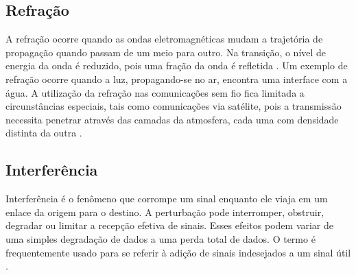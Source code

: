 \subsection{Refração}
\label{sub:refracao}

A refração ocorre quando as ondas eletromagnéticas mudam a trajetória de propagação quando passam de um meio para outro. Na transição, o nível de energia da onda é reduzido, pois uma fração da onda é refletida \cite{flickenger2008}. Um exemplo de refração ocorre quando a luz, propagando-se no ar, encontra uma interface com a água. A utilização da refração nas comunicações sem fio fica limitada a circunstâncias especiais, tais como comunicações via satélite, pois a transmissão necessita penetrar através das camadas da atmosfera, cada uma com densidade distinta da outra \cite{rappaport2009}.

\begin{figure}[H]
	\centering
\end{figure}

\subsection{Interferência}
\label{sub:interferencia}

Interferência é o fenômeno que corrompe um sinal enquanto ele viaja em um enlace da origem para o destino. A perturbação pode interromper, obstruir, degradar ou limitar a recepção efetiva de sinais. Esses efeitos podem variar de uma simples degradação de dados a uma perda total de dados. O termo é frequentemente usado para se referir à adição de sinais indesejados a um sinal útil \cite{flickenger2008}.

